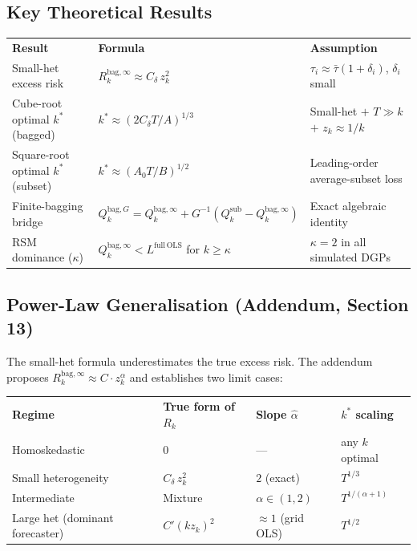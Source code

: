 \documentclass[11pt,a4paper]{article}
\newcommand{\kstar}{k^*}
\newcommand{\Qbaginf}{Q_k^{\mathrm{bag},\infty}}
\newcommand{\Qbag}{Q_k^{\mathrm{bag},G}}
\newcommand{\Qsub}{Q_k^{\mathrm{sub}}}
\newcommand{\Rbag}{R_k^{\mathrm{bag},\infty}}
\newcommand{\Cdelta}{C_{\delta}}
\newcommand{\zk}{z_k}
\newcommand{\ahat}{\hat{\alpha}}
\newcommand{\taubar}{\bar{\tau}}
\begin{document}
\subsection{Key Theoretical Results}

\smallskip
\begin{tabular}{L{3.8cm} L{5.2cm} L{5.4cm}}
\color{white}\bfseries Result &
\color{white}\bfseries Formula &
\color{white}\bfseries Assumption \\
Small-het excess risk & \(\Rbag \approx \Cdelta\,\zk^2\) & \(\tau_i \approx \taubar(1+\delta_i)\), \(\delta_i\) small \\
Cube-root optimal \(\kstar\) (bagged) & \(\kstar \approx (2\Cdelta T/A)^{1/3}\) & Small-het \(+\) \(T\gg k\) \(+\) \(\zk\approx 1/k\) \\
Square-root optimal \(\kstar\) (subset) & \(\kstar \approx (A_0 T/B)^{1/2}\) & Leading-order average-subset loss \\
Finite-bagging bridge & \(\Qbag = \Qbaginf + G^{-1}(\Qsub - \Qbaginf)\) & Exact algebraic identity \\
RSM dominance (\(\kappa\)) & \(\Qbaginf < L^{\mathrm{full\,OLS}}\) for \(k\ge\kappa\) & \(\kappa=2\) in all simulated DGPs \\
\end{tabular}

\subsection{Power-Law Generalisation (Addendum, Section 13)}

The small-het formula underestimates the true excess risk.
The addendum proposes \(\Rbag \approx C\cdot\zk^{\alpha}\) and establishes two limit cases:

\smallskip
\begin{tabular}{L{3.8cm} L{4.2cm} C{2.4cm} C{2.4cm}}
\color{white}\bfseries Regime &
\color{white}\bfseries True form of \(R_k\) &
\color{white}\bfseries Slope \(\ahat\) &
\color{white}\bfseries \(\kstar\) scaling \\
Homoskedastic & \(0\) & --- & any \(k\) optimal \\
Small heterogeneity & \(\Cdelta\,\zk^2\) & \(2\) (exact) & \(T^{1/3}\) \\
Intermediate & Mixture & \(\alpha\in(1,2)\) & \(T^{1/(\alpha+1)}\) \\
Large het (dominant forecaster) & \(C'(k\zk)^2\) & \(\approx 1\) (grid OLS) & \(T^{1/2}\) \\
\end{tabular}
\end{document}
